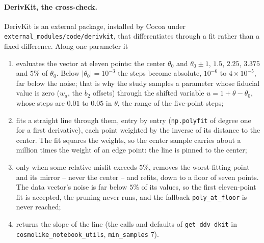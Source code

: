 \documentclass[11pt]{article}
\newcommand{\us}{\_\allowbreak}
\begin{document}
\paragraph{DerivKit, the cross-check.}
DerivKit is an external package, installed by Cocoa under
\texttt{external\us modules/\allowbreak code/\allowbreak derivkit},
that differentiates through a fit rather than a fixed difference.
Along one parameter it
\begin{enumerate}
  \item evaluates the vector at eleven points: the center $\theta_0$
    and $\theta_0 \pm 1$, $1.5$, $2.25$, $3.375$ and $5\%$ of
    $\theta_0$.  Below $|\theta_0| = 10^{-3}$ the steps become
    absolute, $10^{-6}$ to $4\times10^{-5}$, far below the noise;
    that is why the study samples a parameter whose fiducial value is
    zero ($w_a$, the $b_2$ offsets) through the shifted variable
    $u = 1 + \theta - \theta_0$, whose steps are $0.01$ to $0.05$ in
    $\theta$, the range of the five-point steps;
  \item fits a straight line through them, entry by entry
    (\texttt{np.polyfit} of degree one for a first derivative), each
    point weighted by the inverse of its distance to the center.  The
    fit squares the weights, so the center sample carries about a
    million times the weight of an edge point: the line is pinned to
    the center;
  \item only when some relative misfit exceeds $5\%$, removes the
    worst-fitting point and its mirror -- never the center -- and
    refits, down to a floor of seven points.  The data vector's noise
    is far below $5\%$ of its values, so the first eleven-point fit is
    accepted, the pruning never runs, and the fallback
    \texttt{poly\us at\us floor} is never reached;
  \item returns the slope of the line (the calls and defaults of
    \texttt{get\us ddv\us dkit} in
    \texttt{cosmolike\us notebook\us utils},
    \texttt{min\us samples} $7$).
\end{enumerate}
\end{document}
